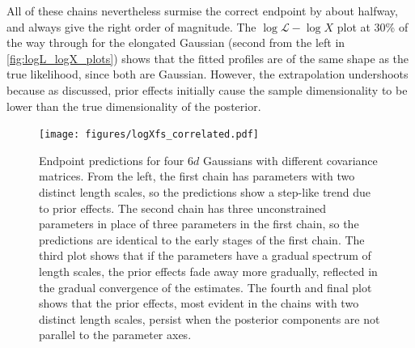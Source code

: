 \documentclass[usenatbib]{mnras}
\newcommand{\Like}{\mathcal{L}}
\begin{document}
\par
All of these chains nevertheless surmise the correct endpoint by about halfway, and always give the right order of magnitude. The $\log\Like-\log X$ plot at 30\% of the way through for the elongated Gaussian (second from the left in \cref{fig:logL_logX_plots}) shows that the fitted profiles are of the same shape as the true likelihood, since both are Gaussian. However, the extrapolation undershoots because as discussed, prior effects initially cause the sample dimensionality to be lower than the true dimensionality of the posterior. 
\begin{figure}
\begin{center}
    \texttt{[image: figures/logXfs\_correlated.pdf]}
\end{center}
\caption{Endpoint predictions for four $6d$ Gaussians with different covariance matrices. From the left, the first chain has parameters with two distinct length scales, so the predictions show a step-like trend due to prior effects. The second chain has three unconstrained parameters in place of three parameters in the first chain, so the predictions are identical to the early stages of the first chain. The third plot shows that if the parameters have a gradual spectrum of length scales, the prior effects fade away more gradually, reflected in the gradual convergence of the estimates. The fourth and final plot shows that the prior effects, most evident in the chains with two distinct length scales, persist when the posterior components are not parallel to the parameter axes.}
\label{fig:logXfs_correlated}
\end{figure}
\end{document}
